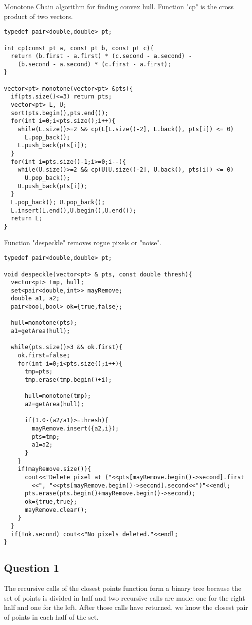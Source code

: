 \documentclass[12pt]{article}
\begin{document}
Monotone Chain algorithm for finding convex hull. Function "cp" is the cross
product of two vectors. 
\begin{lstlisting}[frame=single]
typedef pair<double,double> pt;

int cp(const pt a, const pt b, const pt c){
  return (b.first - a.first) * (c.second - a.second) - 
    (b.second - a.second) * (c.first - a.first);
}

vector<pt> monotone(vector<pt> &pts){
  if(pts.size()<=3) return pts;
  vector<pt> L, U;
  sort(pts.begin(),pts.end());
  for(int i=0;i<pts.size();i++){
    while(L.size()>=2 && cp(L[L.size()-2], L.back(), pts[i]) <= 0)
      L.pop_back();
    L.push_back(pts[i]);
  }
  for(int i=pts.size()-1;i>=0;i--){
    while(U.size()>=2 && cp(U[U.size()-2], U.back(), pts[i]) <= 0)
      U.pop_back();
    U.push_back(pts[i]);
  }
  L.pop_back(); U.pop_back();
  L.insert(L.end(),U.begin(),U.end());
  return L;
}
\end{lstlisting}
\newpage
Function "despeckle" removes rogue pixels or "noise". 
\begin{lstlisting}[frame=single]
typedef pair<double,double> pt; 

void despeckle(vector<pt> & pts, const double thresh){ 
  vector<pt> tmp, hull;
  set<pair<double,int>> mayRemove;
  double a1, a2;
  pair<bool,bool> ok={true,false};

  hull=monotone(pts);
  a1=getArea(hull);

  while(pts.size()>3 && ok.first){
    ok.first=false;
    for(int i=0;i<pts.size();i++){
      tmp=pts;
      tmp.erase(tmp.begin()+i);
      
      hull=monotone(tmp);
      a2=getArea(hull);

      if(1.0-(a2/a1)>=thresh){ 
        mayRemove.insert({a2,i});
        pts=tmp;
        a1=a2;
      }
    }
    if(mayRemove.size()){
      cout<<"Delete pixel at ("<<pts[mayRemove.begin()->second].first
        <<", "<<pts[mayRemove.begin()->second].second<<")"<<endl;
      pts.erase(pts.begin()+mayRemove.begin()->second);
      ok={true,true};
      mayRemove.clear();
    }
  }
  if(!ok.second) cout<<"No pixels deleted."<<endl;
}

\end{lstlisting}


\newpage
\subsection*{Question 1}
\indent 
\par
The recursive calls of the closest points function form a binary tree because the set of points is 
divided in half and two recursive calls are made: one for the right half and one for the left. 
After those calls have returned, we know the closest pair of points in each half of the set. 
\end{document}
